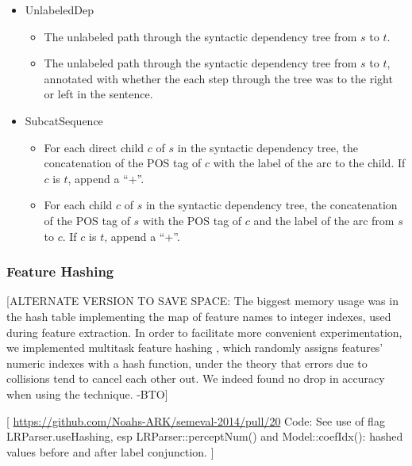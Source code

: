 \documentclass[11pt]{article}
\newcommand{\bocomment}[1]{\textcolor{Bittersweet}{[#1 -BTO]}}
\newcommand{\codenote}[1]{\textcolor{PineGreen}{[#1]}}
\begin{document}
\begin{itemize}
\begin{itemize}
	\end{itemize}
	\item UnlabeledDep
		\begin{itemize}
		\item The unlabeled path through the syntactic dependency tree from $s$ to $t$. 
		\item The unlabeled path through the syntactic dependency tree from $s$ to $t$,
		annotated with whether the each step through the tree was to the right or left in the sentence.
	\end{itemize}
	\item SubcatSequence
		\begin{itemize}
		\item For each direct child $c$ of $s$ in the syntactic dependency tree, the
		concatenation of the POS tag of $c$ with the label of the arc to the child.
		If $c$ is $t$, append a ``+''.
		\item For each child $c$ of $s$ in the syntactic dependency tree, the
		concatenation of the POS tag of $s$ with the POS tag of $c$ and the label of the
		arc from $s$ to $c$.
		If $c$ is $t$, append a ``+''.
	\end{itemize}
\end{itemize}

\subsubsection{Feature Hashing}

\bocomment{ALTERNATE VERSION TO SAVE SPACE:
  The biggest memory usage was in the hash table implementing the map of feature names to integer indexes, used during feature extraction.  In order to facilitate more convenient experimentation, we implemented multitask feature hashing \cite{weinberger_feature_2009}, which randomly assigns features' numeric indexes with a hash function, under the theory that errors due to collisions tend to cancel each other out.  We indeed found no drop in accuracy when using the technique.}


\codenote{
\url{https://github.com/Noahs-ARK/semeval-2014/pull/20}
Code:
  See use of flag LRParser.useHashing, esp LRParser::perceptNum() 
  and Model::coefIdx(): hashed values before and after label conjunction.
}
\end{document}
